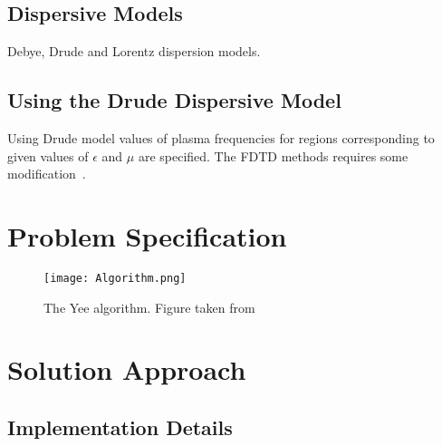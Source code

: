 \documentclass{report}
\begin{document}
\section{Dispersive Models}
Debye, Drude and Lorentz dispersion models.

\section{Using the Drude Dispersive Model}
Using Drude model values of plasma frequencies for regions corresponding to given values of $\epsilon$ and $\mu$ are specified. The FDTD methods requires some modification~\cite{Radial-Zhao}.

\chapter{Problem Specification}

\begin{figure}[here]
\centering
\texttt{[image: Algorithm.png]}
\caption{The Yee algorithm. Figure taken from~\cite{JBSchneiderUFDTD}}
\label{Algorithm}
\end{figure}

\chapter{Solution Approach}



\section{Implementation Details}


\nocite{*}

\end{document}
